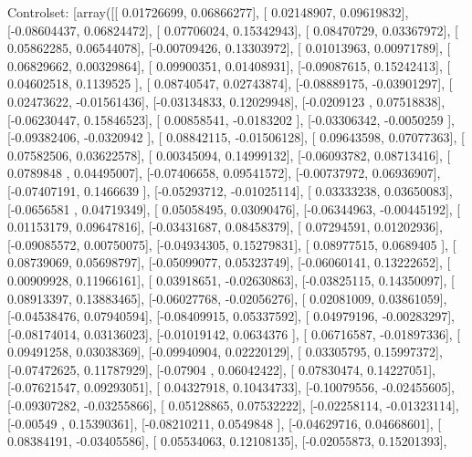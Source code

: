 \documentclass{article}
\begin{document}
Controlset: [array([[ 0.01726699,  0.06866277],
       [ 0.02148907,  0.09619832],
       [-0.08604437,  0.06824472],
       [ 0.07706024,  0.15342943],
       [ 0.08470729,  0.03367972],
       [ 0.05862285,  0.06544078],
       [-0.00709426,  0.13303972],
       [ 0.01013963,  0.00971789],
       [ 0.06829662,  0.00329864],
       [ 0.09900351,  0.01408931],
       [-0.09087615,  0.15242413],
       [ 0.04602518,  0.1139525 ],
       [ 0.08740547,  0.02743874],
       [-0.08889175, -0.03901297],
       [ 0.02473622, -0.01561436],
       [-0.03134833,  0.12029948],
       [-0.0209123 ,  0.07518838],
       [-0.06230447,  0.15846523],
       [ 0.00858541, -0.0183202 ],
       [-0.03306342, -0.0050259 ],
       [-0.09382406, -0.0320942 ],
       [ 0.08842115, -0.01506128],
       [ 0.09643598,  0.07077363],
       [ 0.07582506,  0.03622578],
       [ 0.00345094,  0.14999132],
       [-0.06093782,  0.08713416],
       [ 0.0789848 ,  0.04495007],
       [-0.07406658,  0.09541572],
       [-0.00737972,  0.06936907],
       [-0.07407191,  0.1466639 ],
       [-0.05293712, -0.01025114],
       [ 0.03333238,  0.03650083],
       [-0.0656581 ,  0.04719349],
       [ 0.05058495,  0.03090476],
       [-0.06344963, -0.00445192],
       [ 0.01153179,  0.09647816],
       [-0.03431687,  0.08458379],
       [ 0.07294591,  0.01202936],
       [-0.09085572,  0.00750075],
       [-0.04934305,  0.15279831],
       [ 0.08977515,  0.0689405 ],
       [ 0.08739069,  0.05698797],
       [-0.05099077,  0.05323749],
       [-0.06060141,  0.13222652],
       [ 0.00909928,  0.11966161],
       [ 0.03918651, -0.02630863],
       [-0.03825115,  0.14350097],
       [ 0.08913397,  0.13883465],
       [-0.06027768, -0.02056276],
       [ 0.02081009,  0.03861059],
       [-0.04538476,  0.07940594],
       [-0.08409915,  0.05337592],
       [ 0.04979196, -0.00283297],
       [-0.08174014,  0.03136023],
       [-0.01019142,  0.0634376 ],
       [ 0.06716587, -0.01897336],
       [ 0.09491258,  0.03038369],
       [-0.09940904,  0.02220129],
       [ 0.03305795,  0.15997372],
       [-0.07472625,  0.11787929],
       [-0.07904   ,  0.06042422],
       [ 0.07830474,  0.14227051],
       [-0.07621547,  0.09293051],
       [ 0.04327918,  0.10434733],
       [-0.10079556, -0.02455605],
       [-0.09307282, -0.03255866],
       [ 0.05128865,  0.07532222],
       [-0.02258114, -0.01323114],
       [-0.00549   ,  0.15390361],
       [-0.08210211,  0.0549848 ],
       [-0.04629716,  0.04668601],
       [ 0.08384191, -0.03405586],
       [ 0.05534063,  0.12108135],
       [-0.02055873,  0.15201393],
\end{document}
